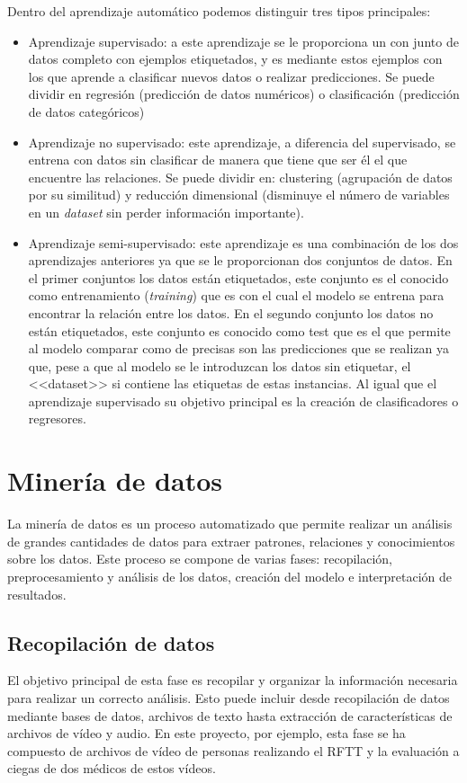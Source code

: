 Dentro del aprendizaje automático podemos distinguir tres tipos principales:
\begin{itemize}
\item Aprendizaje supervisado: a este aprendizaje se le proporciona un con junto de datos completo con ejemplos etiquetados, y es mediante estos ejemplos con los que aprende a clasificar nuevos datos o realizar predicciones. Se puede dividir en regresión (predicción de datos numéricos) o clasificación (predicción de datos categóricos)
\item Aprendizaje no supervisado: este aprendizaje, a diferencia del supervisado, se entrena con datos sin clasificar de manera que tiene que ser él el que encuentre las relaciones. Se puede dividir en: clustering (agrupación de datos por su similitud) y reducción dimensional (disminuye el número de variables en un \textit{dataset} sin perder información importante).
\item Aprendizaje semi-supervisado: este aprendizaje es una combinación de los dos aprendizajes anteriores ya que se le proporcionan dos conjuntos de datos. En el primer conjuntos los datos están etiquetados, este conjunto es el conocido como entrenamiento (\textit{training}) que es con el cual el modelo se entrena para encontrar la relación entre los datos. En el segundo conjunto los datos no están etiquetados, este conjunto es conocido como test que es el que permite al modelo comparar como de precisas son las predicciones que se realizan ya que, pese a que al modelo se le introduzcan los datos sin etiquetar, el <<dataset>> si contiene las etiquetas de estas instancias. Al igual que el aprendizaje supervisado su objetivo principal es la creación de clasificadores o regresores.
\end{itemize}

\section{Minería de datos}

La minería de datos es un proceso automatizado que permite realizar un análisis de grandes cantidades de datos para extraer patrones, relaciones y conocimientos sobre los datos. Este proceso se compone de varias fases: recopilación, preprocesamiento y análisis de los datos, creación del modelo e interpretación de resultados.

\subsection{Recopilación de datos}
El objetivo principal de esta fase es recopilar y organizar la información necesaria para realizar un correcto análisis. Esto puede incluir desde recopilación de datos mediante bases de datos, archivos de texto hasta extracción de características de archivos de vídeo y audio. En este proyecto, por ejemplo, esta fase se ha compuesto de archivos de vídeo de personas realizando el RFTT y la evaluación a ciegas de dos médicos de estos vídeos.


